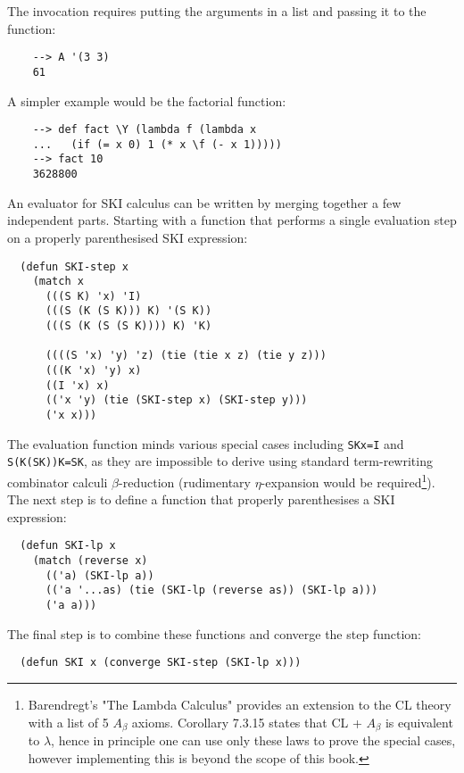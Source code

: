 The invocation requires putting the arguments in a list and passing it to the function:

\begin{Verbatim}
    --> A '(3 3)
    61
\end{Verbatim}

A simpler example would be the factorial function:

\begin{Verbatim}
    --> def fact \Y (lambda f (lambda x
    ...   (if (= x 0) 1 (* x \f (- x 1)))))
    --> fact 10
    3628800
\end{Verbatim}

An evaluator for SKI calculus can be written by merging together a few independent parts. Starting with a function that performs a single evaluation step on a properly parenthesised SKI expression:

\begin{Verbatim}
  (defun SKI-step x
    (match x
      (((S K) 'x) 'I)
      (((S (K (S K))) K) '(S K))
      (((S (K (S (S K)))) K) 'K)

      ((((S 'x) 'y) 'z) (tie (tie x z) (tie y z)))
      (((K 'x) 'y) x)
      ((I 'x) x)
      (('x 'y) (tie (SKI-step x) (SKI-step y)))
      ('x x)))
\end{Verbatim}

The evaluation function minds various special cases including \verb|SKx=I| and \verb|S(K(SK))K=SK|, as they are impossible to derive using standard term-rewriting combinator calculi $\beta$-reduction (rudimentary $\eta$-expansion would be required\footnote{Barendregt's "The Lambda Calculus" provides an extension to the CL theory with a list of 5 $A_\beta$ axioms. Corollary 7.3.15 states that CL + $A_\beta$ is equivalent to $\lambda$, hence in principle one can use only these laws to prove the special cases, however implementing this is beyond the scope of this book.}). The next step is to define a function that properly parenthesises a SKI expression:

\begin{Verbatim}
  (defun SKI-lp x
    (match (reverse x)
      (('a) (SKI-lp a))
      (('a '...as) (tie (SKI-lp (reverse as)) (SKI-lp a)))
      ('a a)))
\end{Verbatim}

The final step is to combine these functions and converge the step function:

\begin{Verbatim}
  (defun SKI x (converge SKI-step (SKI-lp x)))
\end{Verbatim}

